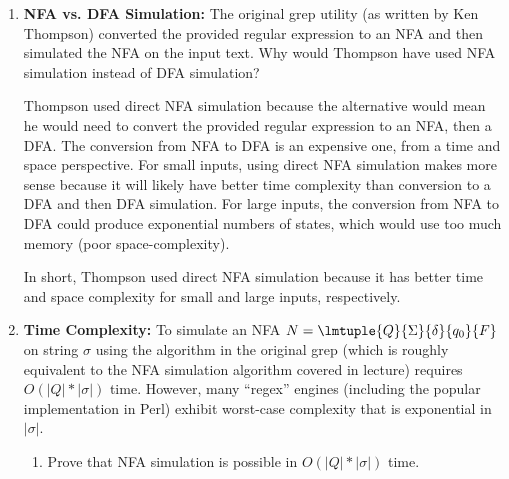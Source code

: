 \documentclass[12pt,letterpaper]{ntdhw}
\begin{document}
\begin{enumerate}
  \item \textbf{NFA vs. DFA Simulation:} The original grep utility (as
  written by Ken Thompson) converted the provided regular expression
  to an NFA and then simulated the NFA on the input text.  Why would
  Thompson have used NFA simulation instead of DFA simulation?

  \smallskip

  Thompson used direct NFA simulation because the alternative would mean he would need to convert the provided regular expression to an NFA, then a DFA. The conversion from NFA to DFA is an expensive one, from a time and space perspective. For small inputs, using direct NFA simulation makes more sense because it will likely have better time complexity than conversion to a DFA and then DFA simulation. For large inputs, the conversion from NFA to DFA could produce exponential numbers of states, which would use too much memory (poor space-complexity). 

  In short, Thompson used direct NFA simulation because it has better time and space complexity for small and large inputs, respectively.

  \clearpage

  \item \textbf{Time Complexity:} To simulate an NFA
  $N=\lmtuple{Q}{\Sigma}{\delta}{q_0}{F}$ on string $\sigma$ using the
  algorithm in the original grep (which is roughly equivalent to the
  NFA simulation algorithm covered in lecture) requires
  $O(|Q|*|\sigma|)$ time. However, many ``regex'' engines (including the
  popular implementation in Perl) exhibit worst-case complexity that
  is exponential in $|\sigma|$.

  \begin{enumerate}
    \item Prove that NFA simulation is possible in $O(|Q|*|\sigma|)$
    time.%

    \smallskip


\end{enumerate}
\end{enumerate}
\end{document}
